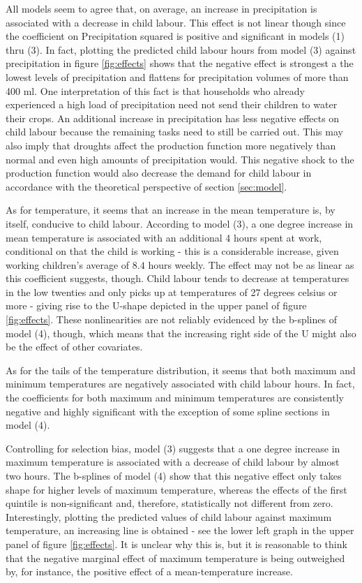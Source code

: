 \documentclass[a4paper,12pt]{article}
\theoremstyle{plain}
\theoremstyle{definition}
\theoremstyle{definition}
\theoremstyle{definition}
\theoremstyle{definition}
\begin{document}
All models seem to agree that, on average, an increase in precipitation is associated with a decrease in child labour. This effect is not linear though since the coefficient on Precipitation squared is positive and significant in models (1) thru (3). In fact, plotting the predicted child labour hours from model (3) against precipitation in figure \ref{fig:effects} shows that the negative effect is strongest a the lowest levels of precipitation and flattens for precipitation volumes of more than 400 ml. One interpretation of this fact is that households who already experienced a high load of precipitation need not send their children to water their crops. An additional increase in precipitation has less negative effects on child labour because the remaining tasks need to still be carried out. This may also imply that droughts affect the production function more negatively than normal and even high amounts of precipitation would. This negative shock to the production function would also decrease the demand for child labour in accordance with the theoretical perspective of section \ref{sec:model}.

As for temperature, it seems that an increase in the mean temperature is, by itself, conducive to child labour. According to model (3), a one degree increase in mean temperature is associated with an additional 4 hours spent at work, conditional on that the child is working - this is a considerable increase, given working children's average of $8.4$ hours weekly. The effect may not be as linear as this coefficient suggests, though. Child labour tends to decrease at temperatures in the low twenties and only picks up at temperatures of 27 degrees celsius or more - giving rise to the U-shape depicted in the upper panel of figure \ref{fig:effects}. These nonlinearities are not reliably evidenced by the b-splines of model (4), though, which means that the increasing right side of the U might also be the effect of other covariates.

As for the tails of the temperature distribution, it seems that both maximum and minimum temperatures are negatively associated with child labour hours. In fact, the coefficients for both maximum and minimum temperatures are consistently negative and highly significant with the exception of some spline sections in model (4). 

Controlling for selection bias, model (3) suggests that a one degree increase in maximum temperature is associated with a decrease of child labour by almost two hours. The b-splines of model (4) show that this negative effect only takes shape for higher levels of maximum temperature, whereas the effects of the first quintile is non-significant and, therefore, statistically not different from zero. Interestingly, plotting the predicted values of child labour against maximum temperature, an increasing line is obtained - see the lower left graph in the upper panel of figure \ref{fig:effects}. It is unclear why this is, but it is reasonable to think that the negative marginal effect of maximum temperature is being outweighed by, for instance, the positive effect of a mean-temperature increase. 
\end{document}
